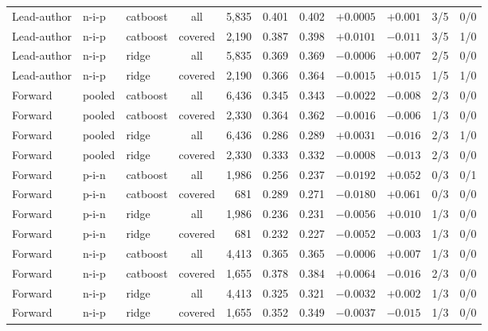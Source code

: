 \documentclass[10pt]{article}
\begin{document}
{\begin{longtable}{lllcrcccccc}
Lead-author & n-i-p & catboost & all & 5,835 & 0.401 & 0.402 & $+0.0005$ & $+0.001$ & 3/5 & 0/0\\
Lead-author & n-i-p & catboost & covered & 2,190 & 0.387 & 0.398 & $+0.0101$ & $-0.011$ & 3/5 & 1/0\\
Lead-author & n-i-p & ridge & all & 5,835 & 0.369 & 0.369 & $-0.0006$ & $+0.007$ & 2/5 & 0/0\\
Lead-author & n-i-p & ridge & covered & 2,190 & 0.366 & 0.364 & $-0.0015$ & $+0.015$ & 1/5 & 1/0\\
Forward & pooled & catboost & all & 6,436 & 0.345 & 0.343 & $-0.0022$ & $-0.008$ & 2/3 & 0/0\\
Forward & pooled & catboost & covered & 2,330 & 0.364 & 0.362 & $-0.0016$ & $-0.006$ & 1/3 & 0/0\\
Forward & pooled & ridge & all & 6,436 & 0.286 & 0.289 & $+0.0031$ & $-0.016$ & 2/3 & 1/0\\
Forward & pooled & ridge & covered & 2,330 & 0.333 & 0.332 & $-0.0008$ & $-0.013$ & 2/3 & 0/0\\
Forward & p-i-n & catboost & all & 1,986 & 0.256 & 0.237 & $-0.0192$ & $+0.052$ & 0/3 & 0/1\\
Forward & p-i-n & catboost & covered & 681 & 0.289 & 0.271 & $-0.0180$ & $+0.061$ & 0/3 & 0/0\\
Forward & p-i-n & ridge & all & 1,986 & 0.236 & 0.231 & $-0.0056$ & $+0.010$ & 1/3 & 0/0\\
Forward & p-i-n & ridge & covered & 681 & 0.232 & 0.227 & $-0.0052$ & $-0.003$ & 1/3 & 0/0\\
Forward & n-i-p & catboost & all & 4,413 & 0.365 & 0.365 & $-0.0006$ & $+0.007$ & 1/3 & 0/0\\
Forward & n-i-p & catboost & covered & 1,655 & 0.378 & 0.384 & $+0.0064$ & $-0.016$ & 2/3 & 0/0\\
Forward & n-i-p & ridge & all & 4,413 & 0.325 & 0.321 & $-0.0032$ & $+0.002$ & 1/3 & 0/0\\
Forward & n-i-p & ridge & covered & 1,655 & 0.352 & 0.349 & $-0.0037$ & $-0.015$ & 1/3 & 0/0\\
\bottomrule\end{longtable}}
\end{document}
